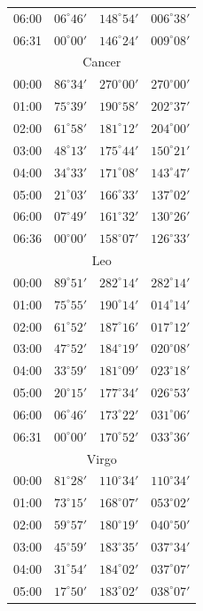 \begin{table}[!h]
\begin{Parallel}{}{}
{{\begin{tabular}{l|lll}
06:00 & $06^\circ 46'$ & $148^\circ 54'$ & $006^\circ 38'$\\
06:31 & $00^\circ 00'$ & $146^\circ 24'$ & $009^\circ 08'$\\
\multicolumn{4}{c}{Cancer}\\
00:00 & $86^\circ 34'$ & $270^\circ 00'$ & $270^\circ 00'$\\
01:00 & $75^\circ 39'$ & $190^\circ 58'$ & $202^\circ 37'$\\
02:00 & $61^\circ 58'$ & $181^\circ 12'$ & $204^\circ 00'$\\
03:00 & $48^\circ 13'$ & $175^\circ 44'$ & $150^\circ 21'$\\
04:00 & $34^\circ 33'$ & $171^\circ 08'$ & $143^\circ 47'$\\
05:00 & $21^\circ 03'$ & $166^\circ 33'$ & $137^\circ 02'$\\
06:00 & $07^\circ 49'$ & $161^\circ 32'$ & $130^\circ 26'$\\
06:36 & $00^\circ 00'$ & $158^\circ 07'$ & $126^\circ 33'$\\
\multicolumn{4}{c}{Leo}\\
00:00 & $89^\circ 51'$ & $282^\circ 14'$ & $282^\circ 14'$\\
01:00 & $75^\circ 55'$ & $190^\circ 14'$ & $014^\circ 14'$\\
02:00 & $61^\circ 52'$ & $187^\circ 16'$ & $017^\circ 12'$\\
03:00 & $47^\circ 52'$ & $184^\circ 19'$ & $020^\circ 08'$\\
04:00 & $33^\circ 59'$ & $181^\circ 09'$ & $023^\circ 18'$\\
05:00 & $20^\circ 15'$ & $177^\circ 34'$ & $026^\circ 53'$\\
06:00 & $06^\circ 46'$ & $173^\circ 22'$ & $031^\circ 06'$\\
06:31 & $00^\circ 00'$ & $170^\circ 52'$ & $033^\circ 36'$\\
\multicolumn{4}{c}{Virgo}\\
00:00 & $81^\circ 28'$ & $110^\circ 34'$ & $110^\circ 34'$\\
01:00 & $73^\circ 15'$ & $168^\circ 07'$ & $053^\circ 02'$\\
02:00 & $59^\circ 57'$ & $180^\circ 19'$ & $040^\circ 50'$\\
03:00 & $45^\circ 59'$ & $183^\circ 35'$ & $037^\circ 34'$\\
04:00 & $31^\circ 54'$ & $184^\circ 02'$ & $037^\circ 07'$\\
05:00 & $17^\circ 50'$ & $183^\circ 02'$ & $038^\circ 07'$\\

\end{tabular}}}
\end{Parallel}
\end{table}
